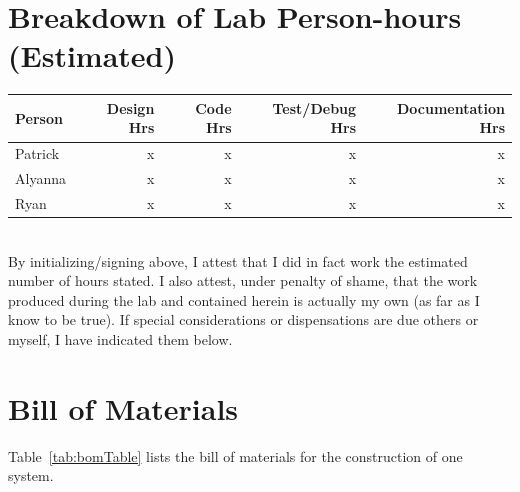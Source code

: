 \documentclass[12pt]{article} %
\begin{document}
\begin{itemize}
\begin{itemize}
\begin{itemize}
\begin{itemize}
\pagebreak
\appendix


\section{Breakdown of Lab Person-hours (Estimated)}
\begin{tabular}{|l|*{4}{r|}}
	\hline
	Person & Design Hrs & Code Hrs & Test/Debug Hrs & Documentation Hrs \\ \hline
	Patrick & x & x & x & x  \\ \hline
	Alyanna & x & x & x & x \\ \hline
	Ryan & x & x & x & x  \\ \hline
\end{tabular}

~\\

By initializing/signing above, I attest that I did in fact work the
estimated number of hours stated. I also attest, under penalty of shame,
that the work produced during the lab and contained herein is actually my
own (as far as I know to be true). If special considerations or
dispensations are due others or myself, I have indicated them below.

\pagebreak

\section{Bill of Materials\label{appendix:bom}}
Table~\ref{tab:bomTable} lists the bill of materials for the construction of
one system.


\end{itemize}
\end{itemize}
\end{itemize}
\end{itemize}
\end{document}
